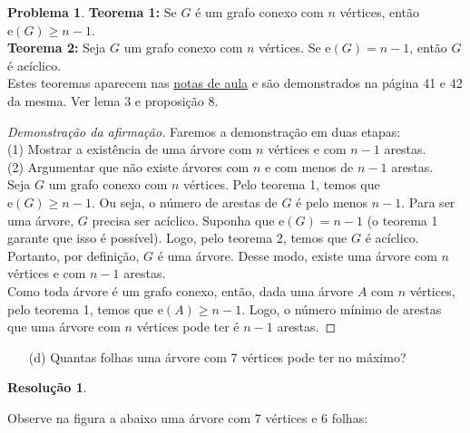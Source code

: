 \documentclass[12pt, a4paper]{article}
\theoremstyle{definition} \newtheorem{prob}{Problema}
\newtheorem*{res}{Resolução}
\begin{document}
\begin{prob}
\textbf{Teorema 1:} Se \(G\) é um grafo conexo com \(n\) vértices, então \(\mathrm{e}(G) \geq n-1\). \\

\textbf{Teorema 2:} Seja \(G\) um grafo conexo com \(n\) vértices. Se \(\mathrm{e}(G) = n-1\), então \(G\) é acíclico. \\

Estes teoremas aparecem nas \href{https://drive.google.com/file/d/16Gy9vck48p64A-3u1t2-uUVGOVqOlAOg/view}{notas de aula} e são demonstrados na página 41 e 42 da mesma. Ver lema 3 e proposição 8. \\

\begin{proof}[Demonstração da afirmação]
Faremos a demonstração em duas etapas: \\

(1) Mostrar a existência de uma árvore com \(n\) vértices e com \(n-1\) arestas.\\

(2) Argumentar que não existe árvores com \(n\) e com menos de \(n-1\) arestas.\\

Seja \(G\) um grafo conexo com \(n\) vértices. Pelo teorema 1, temos que \(\mathrm{e}(G) \geq n-1\). Ou seja, o número de arestas de \(G\) é pelo menos \(n-1\). Para ser uma árvore, \(G\) precisa ser acíclico. Suponha que \(\mathrm{e}(G) = n-1\) (o teorema 1 garante que isso é possível). Logo, pelo teorema 2, temos que \(G\) é acíclico. Portanto, por definição, \(G\) é uma árvore. Desse modo, existe uma árvore com \(n\) vértices e com \(n-1\) arestas. \\

Como toda árvore é um grafo conexo, então, dada uma árvore \(A\) com \(n\) vértices, pelo teorema 1, temos que \(\mathrm{e}(A) \geq n-1\). Logo, o número mínimo de arestas que uma árvore com \(n\) vértices pode ter é \(n-1\) arestas.
  
\end{proof}


\dotfill
\begin{enumerate}
\item[(d)] Quantas folhas uma árvore com 7 vértices pode ter no máximo?
\end{enumerate}
\dotfill
\begin{res}
\end{res}
Observe na figura a abaixo uma árvore com 7 vértices e 6 folhas: \\


\end{prob}
\end{document}
